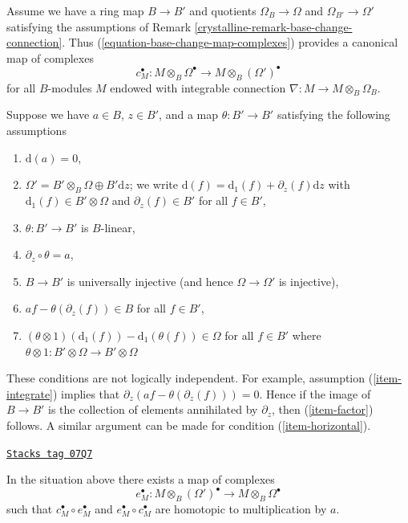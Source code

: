 \medskip\noindent
Assume we have a ring map $B \to B'$ and quotients $\Omega_B \to \Omega$ and
$\Omega_{B'} \to \Omega'$ satisfying the assumptions of
Remark \ref{crystalline-remark-base-change-connection}.
Thus (\ref{equation-base-change-map-complexes}) provides a
canonical map of complexes
$$
c_M^\bullet :
M \otimes_B \Omega^\bullet
\longrightarrow
M \otimes_B (\Omega')^\bullet
$$
for all $B$-modules $M$ endowed with integrable connection
$\nabla : M \to M \otimes_B \Omega_B$.

\medskip\noindent
Suppose we have $a \in B$, $z \in B'$, and a map $\theta : B' \to B'$
satisfying the following assumptions
\begin{enumerate}
\item
\label{crystalline-item-d-a-zero}
$\text{d}(a) = 0$,
\item
\label{crystalline-item-direct-sum}
$\Omega' = B' \otimes_B \Omega \oplus B'\text{d}z$; we write
$\text{d}(f) = \text{d}_1(f) + \partial_z(f) \text{d}z$
with $\text{d}_1(f) \in B' \otimes \Omega$ and $\partial_z(f) \in B'$
for all $f \in B'$,
\item
\label{crystalline-item-theta-linear}
$\theta : B' \to B'$ is $B$-linear,
\item
\label{crystalline-item-integrate}
$\partial_z \circ \theta = a$,
\item
\label{crystalline-item-injective}
$B \to B'$ is universally injective (and hence $\Omega \to \Omega'$
is injective),
\item
\label{crystalline-item-factor}
$af - \theta(\partial_z(f)) \in B$ for all $f \in B'$,
\item
\label{crystalline-item-horizontal}
$(\theta \otimes 1)(\text{d}_1(f)) - \text{d}_1(\theta(f)) \in \Omega$
for all $f \in B'$ where
$\theta \otimes 1 : B' \otimes \Omega \to B' \otimes \Omega$
\end{enumerate}
These conditions are not logically independent.
For example, assumption (\ref{item-integrate}) implies
that $\partial_z(af - \theta(\partial_z(f))) = 0$.
Hence if the image of $B \to B'$ is the collection of
elements annihilated by $\partial_z$, then (\ref{item-factor})
follows. A similar argument can be made for condition (\ref{item-horizontal}).

\begin{lemma}
\label{crystalline-lemma-find-homotopy}
\href{https://stacks.math.columbia.edu/tag/07Q7}{\texttt{Stacks tag 07Q7}}

In the situation above there exists a map of complexes
$$
e_M^\bullet :
M \otimes_B (\Omega')^\bullet
\longrightarrow
M \otimes_B \Omega^\bullet
$$
such that $c_M^\bullet \circ e_M^\bullet$
and $e_M^\bullet \circ c_M^\bullet$ are homotopic to
multiplication by $a$.
\end{lemma}

